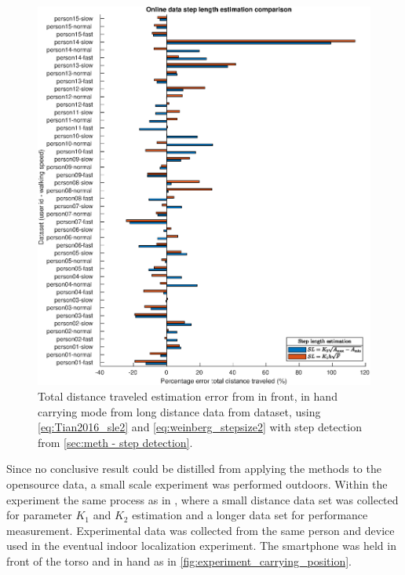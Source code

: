 \begin{figure}[H]
	\centering
	\includegraphics[width=\linewidth]{images/20201128_1403_Online_data_step_length_estimation_comparison}
	\caption{Total distance traveled estimation error from in front, in hand carrying mode from long distance data from \citet{Vezocnik2019} dataset, using \eqref{eq:Tian2016_sle2} and \eqref{eq:weinberg_stepsize2} with step detection from \cref{sec:meth - step detection}. }
	\label{fig:202011131943_wienberg_vs_tian_vezocnik_data1}
\end{figure}
 
Since no conclusive result could be distilled from applying the methods to the opensource data, a small scale experiment was performed outdoors. Within the experiment the same process as in \cite{Vezocnik2019}, where a small distance data set was collected for parameter $ K_1 $ and $ K_2 $ estimation and a longer data set for performance measurement. Experimental data was collected from the same person and device used in the eventual indoor localization experiment. The smartphone was held in front of the torso and in hand as in \cref{fig:experiment_carrying_position}. \par 

